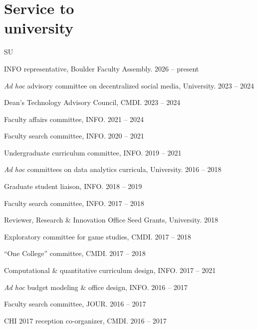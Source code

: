\documentclass{cv}
\begin{document}
	\section{Service to\\university}
	\begin{entries}{SU}
		\item INFO representative, Boulder Faculty Assembly. \hfill 2026 -- present
		\item \textit{Ad hoc} advisory committee on decentralized social media, University. \hfill 2023 -- 2024
		\item Dean's Technology Advisory Council, CMDI. \hfill 2023 -- 2024
		\item Faculty affairs committee, INFO. \hfill 2021 -- 2024
		\item Faculty search committee, INFO. \hfill 2020 -- 2021
		\item Undergraduate curriculum committee, INFO. \hfill 2019 -- 2021
		\item \textit{Ad hoc} committees on data analytics curricula, University. \hfill 2016 -- 2018
		\item Graduate student liaison, INFO. \hfill 2018 -- 2019
		\item Faculty search committee, INFO. \hfill 2017 -- 2018
		\item Reviewer, Research \& Innovation Office Seed Grants, University. \hfill 2018
		\item Exploratory committee for game studies, CMDI. \hfill 2017 -- 2018
		\item ``One College'' committee, CMDI. \hfill 2017 -- 2018
		\item Computational \& quantitative curriculum design, INFO. \hfill 2017 -- 2021
		\item \textit{Ad hoc} budget modeling \& office design, INFO. \hfill 2016 -- 2017
		\item Faculty search committee, JOUR. \hfill 2016 -- 2017
		\item CHI 2017 reception co-organizer, CMDI. \hfill 2016 -- 2017
	\end{entries}
\end{document}
